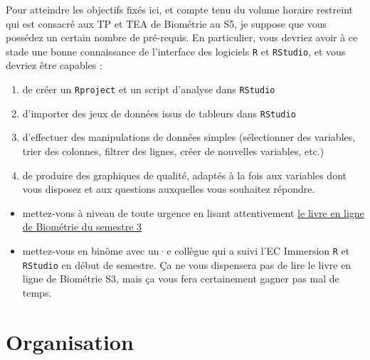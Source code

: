 \documentclass[
  a4paper,
  DIV=11,
  numbers=noendperiod,
  oneside]{scrreprt}
\providecommand{\tightlist}{%
  \setlength{\itemsep}{0pt}\setlength{\parskip}{0pt}}\usepackage{longtable,booktabs,array}
\begin{document}
Pour atteindre les objectifs fixés ici, et compte tenu du volume horaire
restreint qui est consacré aux TP et TEA de Biométrie au S5, je suppose
que vous possédez un certain nombre de pré-requis. En particulier, vous
devriez avoir à ce stade une bonne connaissance de l'interface des
logiciels \texttt{R} et \texttt{RStudio}, et vous devriez être capables
:

\begin{enumerate}
\def\labelenumi{\arabic{enumi}.}
\tightlist
\item
  de créer un \texttt{Rproject} et un script d'analyse dans
  \texttt{RStudio}
\item
  d'importer des jeux de données issus de tableurs dans \texttt{RStudio}
\item
  d'effectuer des manipulations de données simples (sélectionner des
  variables, trier des colonnes, filtrer des lignes, créer de nouvelles
  variables, etc.)
\item
  de produire des graphiques de qualité, adaptés à la fois aux variables
  dont vous disposez et aux questions auxquelles vous souhaitez
  répondre.
\end{enumerate}

\begin{tcolorbox}[enhanced jigsaw, breakable, toprule=.15mm, colbacktitle=quarto-callout-warning-color!10!white, colframe=quarto-callout-warning-color-frame, arc=.35mm, bottomtitle=1mm, opacityback=0, title=\textcolor{quarto-callout-warning-color}{\faExclamationTriangle}\hspace{0.5em}{Si ces pré-requis ne sont pas maîtrisés}, bottomrule=.15mm, colback=white, toptitle=1mm, rightrule=.15mm, leftrule=.75mm, opacitybacktitle=0.6, left=2mm, titlerule=0mm, coltitle=black]

\begin{itemize}
\tightlist
\item
  mettez-vous à niveau de toute urgence en lisant attentivement
  \href{https://besibo.github.io/BiometrieS3/}{le livre en ligne de
  Biométrie du semestre 3}
\item
  mettez-vous en binôme avec un·e collègue qui a suivi l'EC Immersion
  \texttt{R} et \texttt{RStudio} en début de semestre. Ça ne vous
  dispensera pas de lire le livre en ligne de Biométrie S3, mais ça vous
  fera certainement gagner pas mal de temps.
\end{itemize}

\end{tcolorbox}

\hypertarget{organisation}{%
\section*{Organisation}\label{organisation}}
\end{document}
